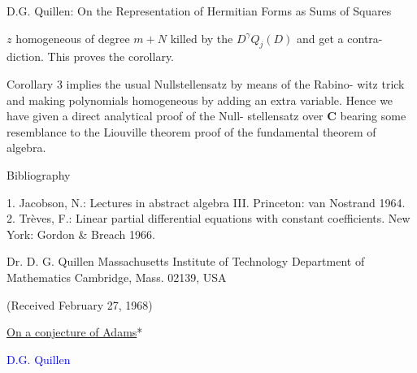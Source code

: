 \documentclass[11pt]{article}
\newcommand{\scanpage}[1]{\par\bigskip\noindent{\small\sffamily[scan #1]}\par}
\newcommand{\mspage}[1]{{\small\sffamily[p.\,#1]}}
\newcommand{\hand}[1]{\textcolor{blue}{#1}}
\newcommand{\uline}[1]{\underline{#1}}
\begin{document}
\mspage{\hand{54}}

\clearpage
\scanpage{162-5/55}
\mspage{242} D.G. Quillen: On the Representation of Hermitian Forms as Sums of Squares

$z$ homogeneous of degree $m+N$ killed by the $D^\gamma Q_j(D)$ and get a contra-%
diction. This proves the corollary.

Corollary 3 implies the usual Nullstellensatz by means of the Rabino-%
witz trick and making polynomials homogeneous by adding an extra
variable. Hence we have given a direct analytical proof of the Null-%
stellensatz over $\mathbf{C}$ bearing some resemblance to the Liouville theorem
proof of the fundamental theorem of algebra.

Bibliography

1. Jacobson, N.: Lectures in abstract algebra III. Princeton: van Nostrand 1964.
2. Trèves, F.: Linear partial differential equations with constant coefficients. New York:
Gordon \& Breach 1966.

Dr. D. G. Quillen
Massachusetts Institute of Technology
Department of Mathematics
Cambridge, Mass. 02139, USA

(Received February 27, 1968)

\mspage{\hand{55}}

\clearpage
\scanpage{162-5/57}
\begin{center}
\uline{On a conjecture of Adams}*

\hand{D.G. Quillen}
\end{center}
\end{document}
